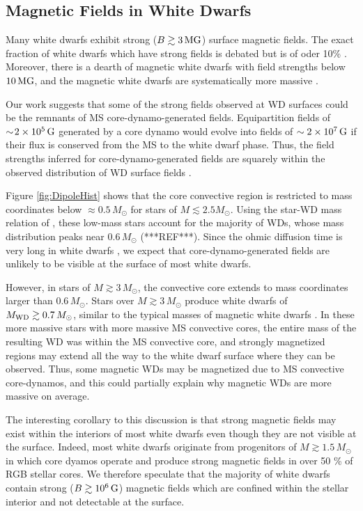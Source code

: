 \subsection{Magnetic Fields in White Dwarfs}

Many white dwarfs exhibit strong ($B \gtrsim 3 \, {\rm MG}$) surface magnetic fields. The exact fraction of white dwarfs which have strong fields is debated but is of oder 10\% \citep{Hollands_2015}. Moreover, there is a dearth of magnetic white dwarfs with field strengths below $10 \, {\rm MG}$, and the magnetic white dwarfs are systematically more massive \citep{Ferrario_2015B}.

Our work suggests that some of the strong fields observed at WD surfaces could be the remnants of MS core-dynamo-generated fields. Equipartition fields of $\sim \! 2 \times 10^5 \, {\rm G}$ generated by a core dynamo would evolve into fields of $\sim 2 \times 10^7 \, {\rm G}$ if their flux is conserved from the MS to the white dwarf phase. Thus, the field strengths inferred for core-dynamo-generated fields are squarely within the observed distribution of WD surface fields \citep{Ferrario_2015B}.

Figure \ref{fig:DipoleHist} shows that the core convective region is restricted to mass coordinates below $\approx 0.5 \, M_\odot$ for stars of $M \lesssim 2.5 M_\odot$. Using the star-WD mass relation of \cite{Renedo_2010}, these low-mass stars account for the majority of WDs, whose mass distribution peaks near $0.6 \, M_\odot$ (***REF***). Since the ohmic diffusion time is very long in white dwarfs \citep{Ferrario_2015B}, we expect that core-dynamo-generated fields are unlikely to be visible at the surface of most white dwarfs. 

However, in stars of $M \gtrsim 3 \, M_\odot$, the convective core extends to mass coordinates larger than $0.6 \, M_\odot$. Stars over $M \gtrsim 3 \, M_\odot$ produce white dwarfs of $M_{\rm WD} \gtrsim 0.7 \, M_\odot$, similar to the typical masses of magnetic white dwarfs \citep{Ferrario_2015B}. In these more massive stars with more massive MS convective cores, the entire mass of the resulting WD was within the MS convective core, and strongly magnetized regions may extend all the way to the white dwarf surface where they can be observed. Thus, some magnetic WDs may be magnetized due to MS convective core-dynamos, and this could partially explain why magnetic WDs are more massive on average.

The interesting corollary to this discussion is that strong magnetic fields may exist within the interiors of most white dwarfs even though they are not visible at the surface. Indeed, most white dwarfs originate from progenitors of $M \gtrsim 1.5 \, M_\odot$ in which core dyamos operate and produce strong magnetic fields in over 50 \% of RGB stellar cores. We therefore speculate that the majority of white dwarfs contain strong ($B \gtrsim 10^6 \, {\rm G}$) magnetic fields which are confined within the stellar interior and not detectable at the surface.





\cite{Ferrario_2015A}
  
  
  
  